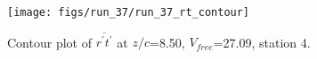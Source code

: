 \begin{figure}[H]
\centering
\texttt{[image: figs/run\_37/run\_37\_rt\_contour]}
\caption{Contour plot of $\overline{r^\prime t^\prime}$ at $z/c$=8.50, $V_{free}$=27.09, station 4.}
\label{fig:run_37_rt_contour}
\end{figure}


